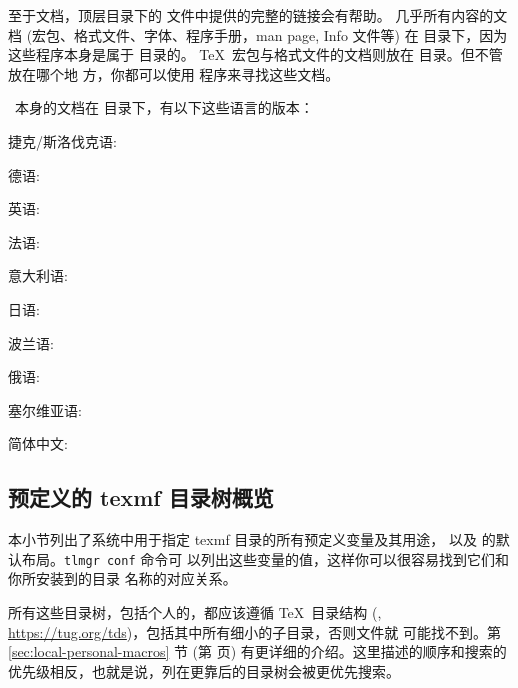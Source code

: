 \documentclass{article}
\begin{document}
至于文档，顶层目录下的  文件中提供的完整的链接会有帮助。
几乎所有内容的文档 (宏包、格式文件、字体、程序手册，man page, Info 文件等) 在
 目录下，因为这些程序本身是属于  目录的。
\TeX\ 宏包与格式文件的文档则放在  目录。但不管放在哪个地
方，你都可以使用  程序来寻找这些文档。

\TL\ 本身的文档在  目录下，有以下这些语言的版本：

\begin{itemize*}
\item{捷克/斯洛伐克语:} 
\item{德语:} 
\item{英语:} 
\item{法语:} 
\item{意大利语:} 
\item{日语:} 
\item{波兰语:} 
\item{俄语:} 
\item{塞尔维亚语:} 
\item{简体中文:} 
\end{itemize*}


\subsection{预定义的 texmf 目录树概览}
\label{sec:texmftrees}

本小节列出了系统中用于指定 texmf 目录的所有预定义变量及其用途，
以及 \TL{} 的默认布局。\texttt{tlmgr~conf} 命令可
以列出这些变量的值，这样你可以很容易找到它们和你所安装到的目录
名称的对应关系。

所有这些目录树，包括个人的，都应该遵循 \TeX\ 目录结构 (\TDS,
\url{https://tug.org/tds})，包括其中所有细小的子目录，否则文件就
可能找不到。第 \ref{sec:local-personal-macros} 节 (第
\pageref{sec:local-personal-macros} 页) 有更详细的介绍。这里描述的顺序和搜索的
优先级相反，也就是说，列在更靠后的目录树会被更优先搜索。
\end{document}
